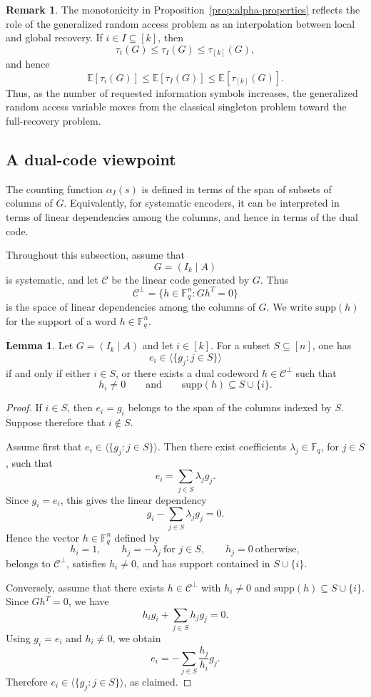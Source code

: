 \documentclass[11pt,a4paper]{article}
\numberwithin{equation}{section}
\theoremstyle{definition}
\newtheorem{remark}[definition]{Remark}
\theoremstyle{definition}
\newtheorem{lemma}[definition]{Lemma}
\newcommand{\F}{\mathbb{F}}
\newcommand{\E}{\mathbb{E}}
\newcommand{\Span}{\langle}
\newcommand{\cC}{\mathcal{C}}
\newcommand{\supp}{\mathrm{supp}}
\begin{document}
\begin{remark}\label{rem:interpolation-monotonicity}
The monotonicity in Proposition~\ref{prop:alpha-properties} reflects the role
of the generalized random access problem as an interpolation between local and
global recovery.  If $i\in I\subseteq [k]$, then
\[
\tau_i(G)\leq \tau_I(G)\leq \tau_{[k]}(G),
\]
and hence
\[
\E[\tau_i(G)]\leq \E[\tau_I(G)]\leq \E[\tau_{[k]}(G)].
\]
Thus, as the number of requested information symbols increases, the generalized
random access variable moves from the classical singleton problem toward the
full-recovery problem.
\end{remark}

\subsection{A dual-code viewpoint}\label{subsec:dual-viewpoint}

The counting function $\alpha_I(s)$ is defined in terms of the span of
subsets of columns of $G$.  Equivalently, for systematic encoders, it can be
interpreted in terms of linear dependencies among the columns, and hence in
terms of the dual code.

Throughout this subsection, assume that
\[
G=(I_k\mid A)
\]
is systematic, and let $\cC$ be the linear code generated by $G$.  Thus
\[
\cC^\perp=\{h\in \F_q^n : Gh^T=0\}
\]
is the space of linear dependencies among the columns of $G$.  We write
$\supp(h)$ for the support of a word $h\in \F_q^n$.

\begin{lemma}\label{lem:dual-recovery-single}
Let $G=(I_k\mid A)$ and let $i\in [k]$.  For a subset
$S\subseteq [n]$, one has
\[
e_i\in \Span\{g_j:j\in S\}\rangle
\]
if and only if either $i\in S$, or there exists a dual codeword
$h\in \cC^\perp$ such that
\[
h_i\neq 0
\qquad\text{and}\qquad
\supp(h)\subseteq S\cup\{i\}.
\]
\end{lemma}

\begin{proof}
If $i\in S$, then $e_i=g_i$ belongs to the span of the columns indexed by
$S$.  Suppose therefore that $i\notin S$.

Assume first that $e_i\in \Span\{g_j:j\in S\}\rangle$.  Then there exist
coefficients $\lambda_j\in \F_q$, for $j\in S$, such that
\[
e_i=\sum_{j\in S}\lambda_j g_j.
\]
Since $g_i=e_i$, this gives the linear dependency
\[
g_i-\sum_{j\in S}\lambda_j g_j=0.
\]
Hence the vector $h\in \F_q^n$ defined by
\[
h_i=1,
\qquad
h_j=-\lambda_j \ \text{for } j\in S,
\qquad
h_j=0 \ \text{otherwise},
\]
belongs to $\cC^\perp$, satisfies $h_i\neq 0$, and has support contained
in $S\cup\{i\}$.

Conversely, assume that there exists $h\in \cC^\perp$ with $h_i\neq 0$
and $\supp(h)\subseteq S\cup\{i\}$.  Since $Gh^T=0$, we have
\[
h_i g_i+\sum_{j\in S} h_j g_j=0.
\]
Using $g_i=e_i$ and $h_i\neq 0$, we obtain
\[
e_i=-\sum_{j\in S}\frac{h_j}{h_i}g_j.
\]
Therefore $e_i\in \Span\{g_j:j\in S\}\rangle$, as claimed.
\end{proof}
\end{document}
